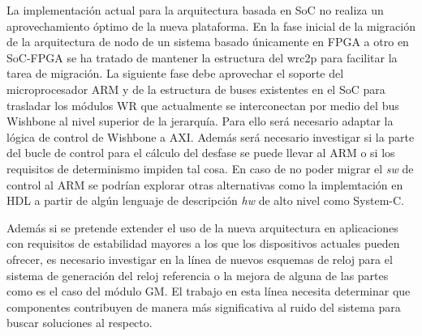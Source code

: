 La implementación actual para la arquitectura basada en SoC no realiza un 
aprovechamiento óptimo de la nueva plataforma. En la fase inicial de la 
migración de la arquitectura de nodo de un sistema basado únicamente en FPGA a 
otro en SoC-FPGA se ha tratado de mantener la estructura del \gls{wrc2p} para 
facilitar la tarea de migración. La siguiente fase debe aprovechar el soporte 
del microprocesador ARM y de la estructura de buses existentes en el SoC para 
trasladar los módulos WR que actualmente se interconectan por medio del bus 
Wishbone al nivel superior de la jerarquía. Para ello será necesario adaptar la 
lógica de control de Wishbone a AXI. Además será necesario investigar si la 
parte del bucle de control para el cálculo del desfase se puede llevar al ARM o 
si los requisitos de determinismo impiden tal cosa. En caso de no poder migrar 
el \textit{sw} de control al ARM se podrían explorar otras alternativas como la 
implemtación en HDL a partir de algún lenguaje de descripción \textit{hw} de 
alto nivel como System-C.

Además si se pretende extender el uso de la nueva arquitectura en aplicaciones 
con requisitos de estabilidad mayores a los que los dispositivos actuales 
pueden ofrecer, es necesario investigar en la línea de nuevos esquemas de reloj 
para el sistema de generación del reloj referencia o la mejora de alguna de las 
partes como es el caso del módulo GM. El trabajo en esta línea necesita 
determinar que componentes contribuyen de manera más significativa al ruido del 
sistema para buscar soluciones al respecto.
